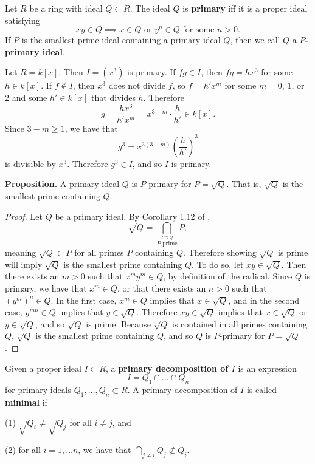 \documentclass[12pt]{article}
\newenvironment{example}[2][Example]{\begin{trivlist}
\item[\hskip \labelsep {\bfseries #1}\hskip \labelsep {\bfseries #2.}]}{\end{trivlist}}
\newenvironment{definition}[2][Definition]{\begin{trivlist}
\item[\hskip \labelsep {\bfseries #1}\hskip \labelsep {\bfseries #2.}]}{\end{trivlist}}
\begin{document}
\begin{definition}{5}
	Let $R$ be a ring with ideal $Q \subset R$. The ideal $Q$ is \textbf{primary} iff it is a proper ideal satisfying \[ xy \in Q \implies x \in Q \text{ or } y^n \in Q\text{ for some } n > 0. \] If $P$ is the smallest prime ideal containing a primary ideal $Q$, then we call $Q$ a \textbf{$P$-primary ideal}.
\end{definition}


\begin{example}{6}
	Let $R = k[x]$. Then $I = (x^3)$ is primary. If $fg \in I$, then $fg = hx^3$ for some $h \in k[x]$. If $f \notin I$, then $x^3$ does not divide $f$, so $f = h'x^m$ for some $m = 0$, $1$, or $2$ and some $h' \in k[x]$ that divides $h$. Therefore \[ g = \frac{hx^3}{h'x^m} = x^{3 - m} \cdot \frac{h}{h'} \in k[x]. \] Since $3 - m \geq 1$, we have that \[ g^3 = x^{3(3 - m)} \left(\frac{h}{h'}\right)^3 \] is divisible by $x^3$. Therefore $g^3 \in I$, and so $I$ is primary. 
\end{example}


\noindent \textbf{Proposition.} A primary ideal $Q$ is $P$-primary for $P = \sqrt{Q}$. That is, $\sqrt{Q}$ is the smallest prime containing $Q$. 

\begin{proof}
	Let $Q$ be a primary ideal. By Corollary 1.12 of \cite{reid1995undergraduate}, \[ \sqrt{Q} = \bigcap_{\stackrel{P \supset Q}{P \text{ prime}}} P, \] meaning $\sqrt{Q} \subset P$ for all primes $P$ containing $Q$. Therefore showing $\sqrt{Q}$ is prime will imply $\sqrt{Q}$ is the smallest prime containing $Q$. To do so, let $xy \in \sqrt{Q}$. Then there exists an $m > 0$ such that $x^m y^m \in Q$, by definition of the radical. Since $Q$ is primary, we have that $x^m \in Q$, or that there exists an $n > 0$ such that $(y^m)^n \in Q$. In the first case, $x^m \in Q$ implies that $x \in \sqrt{Q}$, and in the second case, $y^{mn} \in Q$ implies that $y \in \sqrt{Q}$. Therefore $xy \in \sqrt{Q}$ implies that $x \in \sqrt{Q}$ or $y \in \sqrt{Q}$, and so $\sqrt{Q}$ is prime. Because $\sqrt{Q}$ is contained in all primes containing $Q$, $\sqrt{Q}$ is the smallest prime containing $Q$, and so $Q$ is $P$-primary for $P = \sqrt{Q}$. 
\end{proof}


\begin{definition}{6}
	Given a proper ideal $I \subset R$, a \textbf{primary decomposition of $I$} is an expression \[ I = Q_1 \cap \dots \cap Q_n \] for primary ideals $Q_1, \dots, Q_n \subset R$. A primary decomposition of $I$ is called \textbf{minimal} if 

	(1) $\sqrt{Q_i} \neq \sqrt{Q_j}$ for all $i \neq j$, and 

	(2) for all $i = 1, \dots n$, we have that $\bigcap_{j \neq i} Q_j \not \subset Q_i$.
\end{definition}
\end{document}
